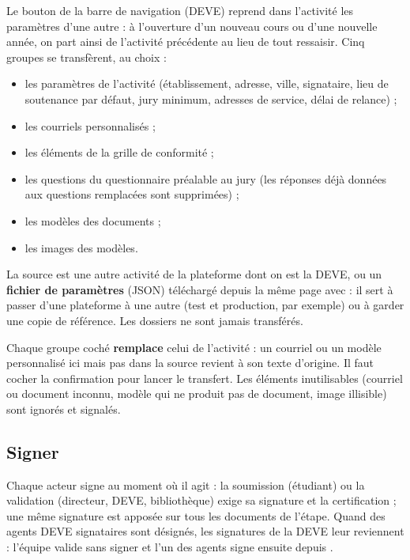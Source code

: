 \documentclass[11pt,a4paper]{article}
\begin{document}
Le bouton  de la barre de navigation (DEVE)
reprend dans l'activité les paramètres d'une autre : à l'ouverture d'un
nouveau cours ou d'une nouvelle année, on part ainsi de l'activité précédente
au lieu de tout ressaisir. Cinq groupes se transfèrent, au choix :
\begin{itemize}
  \item les paramètres de l'activité (établissement, adresse, ville,
        signataire, lieu de soutenance par défaut, jury minimum, adresses de
        service, délai de relance) ;
  \item les courriels personnalisés ;
  \item les éléments de la grille de conformité ;
  \item les questions du questionnaire préalable au jury (les réponses déjà
        données aux questions remplacées sont supprimées) ;
  \item les modèles des documents ;
  \item les images des modèles.
\end{itemize}

La source est une autre activité de la plateforme dont on est la DEVE, ou un
\textbf{fichier de paramètres} (JSON) téléchargé depuis la même page avec
 : il sert à passer d'une
plateforme à une autre (test et production, par exemple) ou à garder une
copie de référence. Les dossiers ne sont jamais transférés.


\begin{attention}
Chaque groupe coché \textbf{remplace} celui de l'activité : un courriel ou un
modèle personnalisé ici mais pas dans la source revient à son texte d'origine.
Il faut cocher la confirmation pour lancer le transfert. Les éléments
inutilisables (courriel ou document inconnu, modèle qui ne produit pas de
document, image illisible) sont ignorés et signalés.
\end{attention}

\subsection{Signer}

Chaque acteur signe au moment où il agit : la soumission (étudiant) ou la
validation (directeur, DEVE, bibliothèque) exige sa signature et la
certification ; une même signature est apposée sur tous les documents de
l'étape. Quand des agents DEVE signataires sont désignés, les signatures de la
DEVE leur reviennent : l'équipe valide sans signer et l'un des agents signe
ensuite depuis .
\end{document}
